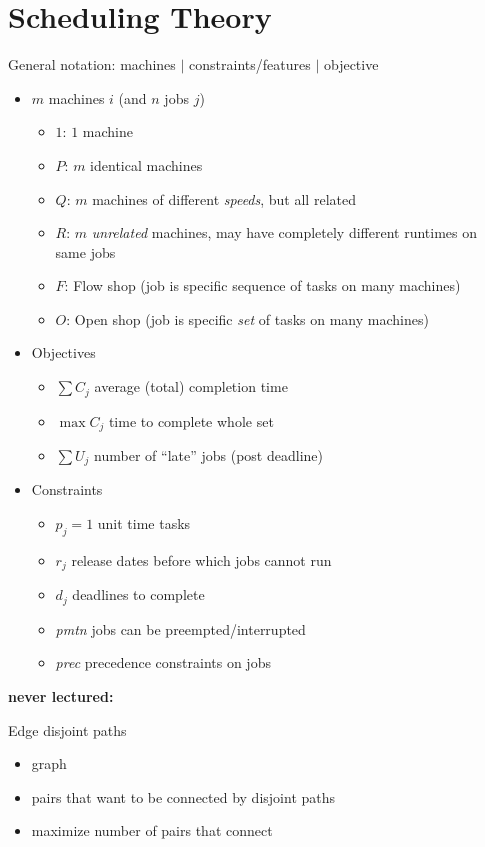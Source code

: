 \documentclass{article}
\begin{document}
\section{Scheduling Theory}

General notation: machines $\mid$ constraints/features $\mid$ objective
\begin{itemize}
\item $m$ machines $i$ (and $n$ jobs $j$)
\begin{itemize}
\item $1$: $1$ machine
\item $P$: $m$ identical machines
\item $Q$: $m$ machines of different \emph{speeds}, but all related
\item $R$: $m$ \emph{unrelated} machines, may have completely
  different runtimes on same jobs
\item $F$: Flow shop (job is specific sequence of tasks on many machines)
\item $O$: Open shop (job is specific \emph{set} of tasks on many machines)
\end{itemize}
\item Objectives
\begin{itemize}
\item $\sum C_j$ average (total) completion time
\item $\max C_j$ time to complete whole set
\item $\sum U_j$ number of ``late'' jobs (post deadline)
\end{itemize}
\item Constraints
\begin{itemize}
\item $p_j=1$ unit time tasks
\item $r_j$ release dates before which jobs cannot run
\item $d_j$ deadlines to complete
\item \emph{pmtn} jobs can be preempted/interrupted
\item \emph{prec} precedence constraints on jobs
\end{itemize}
\end{itemize}

\iffalse
\textbf{never lectured:}

Edge disjoint paths
\begin{itemize}
\item graph
\item pairs that want to be connected by disjoint paths
\item maximize number of pairs that connect
\end{itemize}
\end{document}
